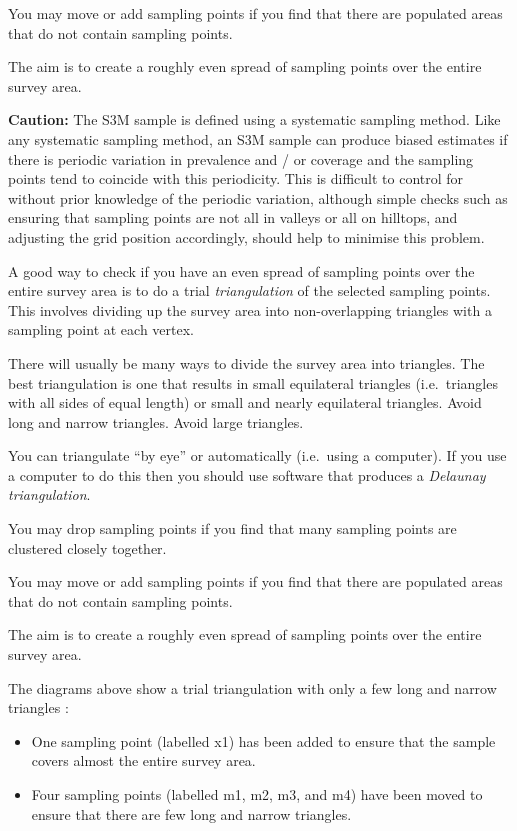 \documentclass[12pt,a4paper]{book}
\theoremstyle{definition}
\theoremstyle{definition}
\theoremstyle{definition}
\theoremstyle{remark}
\let\BeginKnitrBlock\begin \let\EndKnitrBlock\end
\begin{document}
You may move or add sampling points if you find that there are populated
areas that do not contain sampling points.

The aim is to create a roughly even spread of sampling points over the
entire survey area.

\BeginKnitrBlock{rmdwarning}
\textbf{Caution:} The S3M sample is defined using a systematic sampling
method. Like any systematic sampling method, an S3M sample can produce
biased estimates if there is periodic variation in prevalence and / or
coverage and the sampling points tend to coincide with this periodicity.
This is difficult to control for without prior knowledge of the periodic
variation, although simple checks such as ensuring that sampling points
are not all in valleys or all on hilltops, and adjusting the grid
position accordingly, should help to minimise this problem.
\EndKnitrBlock{rmdwarning}

A good way to check if you have an even spread of sampling points over
the entire survey area is to do a trial \emph{triangulation} of the
selected sampling points. This involves dividing up the survey area into
non-overlapping triangles with a sampling point at each vertex.

There will usually be many ways to divide the survey area into
triangles. The best triangulation is one that results in small
equilateral triangles (i.e.~triangles with all sides of equal length) or
small and nearly equilateral triangles. Avoid long and narrow triangles.
Avoid large triangles.

You can triangulate ``by eye'' or automatically (i.e.~using a computer).
If you use a computer to do this then you should use software that
produces a \emph{Delaunay triangulation}.

You may drop sampling points if you find that many sampling points are
clustered closely together.

You may move or add sampling points if you find that there are populated
areas that do not contain sampling points.

The aim is to create a roughly even spread of sampling points over the
entire survey area.

The diagrams above show a trial triangulation with only a few long and
narrow triangles :

\begin{itemize}
\item
  One sampling point (labelled x1) has been added to ensure that the
  sample covers almost the entire survey area.
\item
  Four sampling points (labelled m1, m2, m3, and m4) have been moved to
  ensure that there are few long and narrow triangles.
\end{itemize}
\end{document}
